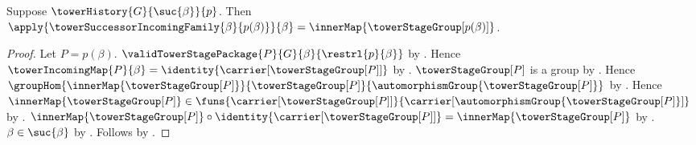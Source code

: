 \begin{proposition}\label{tower_successor_incoming_at_predecessor}
    Suppose $\towerHistory{G}{\suc{\beta}}{p}$.
    Then $\apply{\towerSuccessorIncomingFamily{\beta}{p(\beta)}}{\beta}
        =\innerMap{\towerStageGroup[p(\beta)]}$.
\end{proposition}
\begin{proof}
    Let $P=p(\beta)$.
    $\validTowerStagePackage{P}{G}{\beta}{\restrl{p}{\beta}}$ by
        .
    Hence $\towerIncomingMap{P}{\beta}=
        \identity{\carrier[\towerStageGroup[P]]}$ by
        .
    $\towerStageGroup[P]$ is a group by
        .
    Hence $\groupHom
        {\innerMap{\towerStageGroup[P]}}
        {\towerStageGroup[P]}
        {\automorphismGroup{\towerStageGroup[P]}}$ by
        .
    Hence $\innerMap{\towerStageGroup[P]}\in
        \funs{\carrier[\towerStageGroup[P]]}{
            \carrier[\automorphismGroup{\towerStageGroup[P]}]}$ by
        .
    $\innerMap{\towerStageGroup[P]}\circ
        \identity{\carrier[\towerStageGroup[P]]}
        =\innerMap{\towerStageGroup[P]}$ by
        .
    $\beta\in\suc{\beta}$ by .
    Follows by .
\end{proof}

